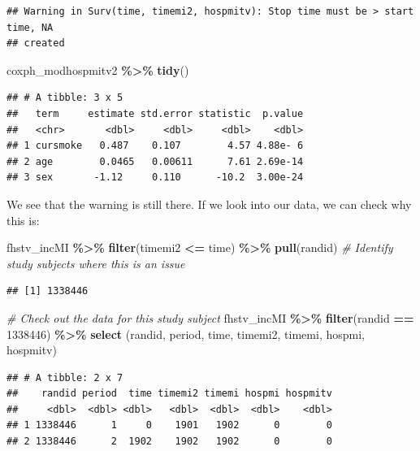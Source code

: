 \documentclass[
]{book}
\newenvironment{Shaded}{\begin{snugshade}}{\end{snugshade}}
\newcommand{\CommentTok}[1]{\textcolor[rgb]{0.56,0.35,0.01}{\textit{#1}}}
\newcommand{\FunctionTok}[1]{\textcolor[rgb]{0.13,0.29,0.53}{\textbf{#1}}}
\newcommand{\NormalTok}[1]{#1}
\newcommand{\SpecialCharTok}[1]{\textcolor[rgb]{0.81,0.36,0.00}{\textbf{#1}}}
\newcommand{\StringTok}[1]{\textcolor[rgb]{0.31,0.60,0.02}{#1}}
\begin{document}
\begin{verbatim}
## Warning in Surv(time, timemi2, hospmitv): Stop time must be > start time, NA
## created
\end{verbatim}

\begin{Shaded}
\begin{Highlighting}[]
\NormalTok{coxph\_modhospmitv2 }\SpecialCharTok{\%\textgreater{}\%}
  \FunctionTok{tidy}\NormalTok{()}
\end{Highlighting}
\end{Shaded}

\begin{verbatim}
## # A tibble: 3 x 5
##   term     estimate std.error statistic  p.value
##   <chr>       <dbl>     <dbl>     <dbl>    <dbl>
## 1 cursmoke   0.487    0.107        4.57 4.88e- 6
## 2 age        0.0465   0.00611      7.61 2.69e-14
## 3 sex       -1.12     0.110      -10.2  3.00e-24
\end{verbatim}

We see that the warning is still there. If we look into our data, we can check why this is:

\begin{Shaded}
\begin{Highlighting}[]
\NormalTok{fhstv\_incMI }\SpecialCharTok{\%\textgreater{}\%}
  \FunctionTok{filter}\NormalTok{(timemi2 }\SpecialCharTok{\textless{}=}\NormalTok{ time) }\SpecialCharTok{\%\textgreater{}\%}
  \FunctionTok{pull}\NormalTok{(randid) }\CommentTok{\# Identify study subjects where this is an issue}
\end{Highlighting}
\end{Shaded}

\begin{verbatim}
## [1] 1338446
\end{verbatim}

\begin{Shaded}
\begin{Highlighting}[]
\CommentTok{\# Check out the data for this study subject}
\NormalTok{fhstv\_incMI }\SpecialCharTok{\%\textgreater{}\%} 
  \FunctionTok{filter}\NormalTok{(randid }\SpecialCharTok{==} \StringTok{\textquotesingle{}1338446\textquotesingle{}}\NormalTok{) }\SpecialCharTok{\%\textgreater{}\%}
  \FunctionTok{select}\NormalTok{ (randid, period, time, timemi2, timemi, hospmi, hospmitv)}
\end{Highlighting}
\end{Shaded}

\begin{verbatim}
## # A tibble: 2 x 7
##    randid period  time timemi2 timemi hospmi hospmitv
##     <dbl>  <dbl> <dbl>   <dbl>  <dbl>  <dbl>    <dbl>
## 1 1338446      1     0    1901   1902      0        0
## 2 1338446      2  1902    1902   1902      0        0
\end{verbatim}
\end{document}
